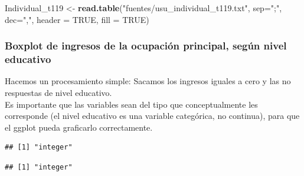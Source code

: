 \documentclass[]{book}
\newenvironment{Shaded}{\begin{snugshade}}{\end{snugshade}}
\newcommand{\CommentTok}[1]{\textcolor[rgb]{0.56,0.35,0.01}{\textit{#1}}}
\newcommand{\DataTypeTok}[1]{\textcolor[rgb]{0.13,0.29,0.53}{#1}}
\newcommand{\KeywordTok}[1]{\textcolor[rgb]{0.13,0.29,0.53}{\textbf{#1}}}
\newcommand{\NormalTok}[1]{#1}
\newcommand{\OperatorTok}[1]{\textcolor[rgb]{0.81,0.36,0.00}{\textbf{#1}}}
\newcommand{\OtherTok}[1]{\textcolor[rgb]{0.56,0.35,0.01}{#1}}
\newcommand{\StringTok}[1]{\textcolor[rgb]{0.31,0.60,0.02}{#1}}
\begin{document}
\begin{Shaded}
\begin{Highlighting}[]

\NormalTok{Individual_t119 <-}\StringTok{ }\KeywordTok{read.table}\NormalTok{(}\StringTok{"fuentes/usu_individual_t119.txt"}\NormalTok{,}
                              \DataTypeTok{sep=}\StringTok{";"}\NormalTok{, }\DataTypeTok{dec=}\StringTok{","}\NormalTok{, }\DataTypeTok{header =} \OtherTok{TRUE}\NormalTok{, }\DataTypeTok{fill =} \OtherTok{TRUE}\NormalTok{)}
\end{Highlighting}
\end{Shaded}

\hypertarget{boxplot-de-ingresos-de-la-ocupacion-principal-segun-nivel-educativo}{%
\subsubsection{Boxplot de ingresos de la ocupación principal, según nivel educativo}\label{boxplot-de-ingresos-de-la-ocupacion-principal-segun-nivel-educativo}}

Hacemos un procesamiento simple: Sacamos los ingresos iguales a cero y las no respuestas de nivel educativo.\\
Es importante que las variables sean del tipo que conceptualmente les corresponde (el nivel educativo es una variable categórica, no continua), para que el ggplot pueda graficarlo correctamente.

\begin{Shaded}
\end{Shaded}

\begin{verbatim}
## [1] "integer"
\end{verbatim}

\begin{Shaded}
\end{Shaded}

\begin{verbatim}
## [1] "integer"
\end{verbatim}
\end{document}
